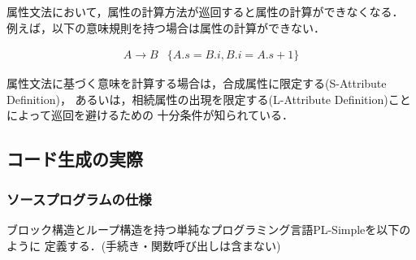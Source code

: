 \documentclass[dvipdfmx,a4j]{jbook}
\begin{document}
属性文法において，属性の計算方法が巡回すると属性の計算ができなくなる．
例えば，以下の意味規則を持つ場合は属性の計算ができない．

\[\begin{array}{ll}
        A\rightarrow B & \{A.s = B.i, B.i = A.s + 1\}
    \end{array}\]

属性文法に基づく意味を計算する場合は，合成属性に限定する(S-Attribute Definition)，
あるいは，相続属性の出現を限定する(L-Attribute Definition)ことによって巡回を避けるための
十分条件が知られている．

\subsection{コード生成の実際}

\subsubsection{ソースプログラムの仕様}

ブロック構造とループ構造を持つ単純なプログラミング言語PL-Simpleを以下のように
定義する．(手続き・関数呼び出しは含まない)
\end{document}
